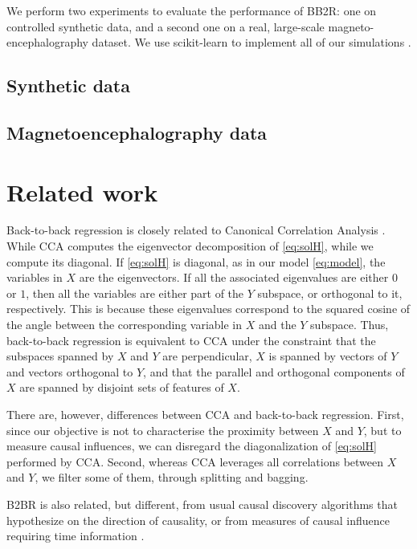 \documentclass{article}
\begin{document}
We perform two experiments to evaluate the performance of BB2R: one on controlled synthetic data, and a second one on a real, large-scale magneto-encephalography dataset.
%
We use scikit-learn to implement all of our simulations \citep{sklearn}.

\subsection{Synthetic data}
\label{sec:experiment_synthetic}



\subsection{Magnetoencephalography data}
\label{sec:experiment_real}



\section{Related work}

Back-to-back regression is closely related to Canonical Correlation Analysis \citep{cca_hotelling}.
%
While CCA computes the eigenvector decomposition of \eqref{eq:solH}, while we compute its diagonal.
%
If \eqref{eq:solH} is diagonal, as in our model \eqref{eq:model}, the variables in $X$ are the eigenvectors.
%
If all the associated eigenvalues are either $0$ or $1$, then all the variables are either part of the $Y$ subspace, or orthogonal to it, respectively.
%
This is because these eigenvalues correspond to the squared cosine of the angle between the corresponding variable in $X$ and the $Y$ subspace.
%
Thus, back-to-back regression is equivalent to CCA under the constraint that the subspaces spanned by $X$ and $Y$ are perpendicular, $X$ is spanned by vectors of $Y$ and vectors orthogonal to $Y$, and that the parallel and orthogonal components of $X$ are spanned by disjoint sets of features of $X$.

There are, however, differences between CCA and back-to-back regression.
%
First, since our objective is not to characterise the proximity between $X$ and $Y$, but to measure causal influences, we can disregard the diagonalization of \eqref{eq:solH} performed by CCA.
%
Second, whereas CCA leverages all correlations between $X$ and $Y$, we filter some of them, through splitting and bagging.

B2BR is also related, but different, from usual causal discovery algorithms \citep{peters2017elements} that hypothesize on the direction of causality, or from measures of causal influence requiring time information \citep{granger1969investigating, janzing2013quantifying}.
\end{document}
